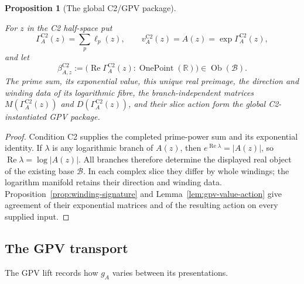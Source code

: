 \documentclass[11pt]{article}
\newcommand{\RR}{\mathbb{R}}
\providecommand{\lean}[1]{}
\providecommand{\uses}[1]{}
\theoremstyle{plain}
\newtheorem{proposition}[theorem]{Proposition}
\theoremstyle{definition}
\theoremstyle{remark}
\begin{document}
\begin{proposition}[The global C2/GPV package]\label{prop:c2-gpv-package}
\lean{ASection.C2GpvPackage.exp_canonicalLift,
ASection.C2GpvPackage.canonicalLift_eq_primePower,
ASection.C2GpvPackage.branch_re_eq,
ASection.C2GpvPackage.branch_winding,
ASection.C2GpvPackage.branch_realPreimage_eq,
ASection.C2GpvPackage.branch_exponentialMatrix_eq,
ASection.C2GpvPackage.branch_diskAction_eq,
ASection.C2GpvPackage.branch_sliceActionHom_eq}
\uses{def:A-section, thm:log-manifold, lem:gpv-value-action}
For $z$ in the C2 half-space put
\[
 \Gamma_A^{\mathrm{C2}}(z)=\sum_p\ell_p(z),\qquad
 v_A^{\mathrm{C2}}(z)=A(z)=\exp\Gamma_A^{\mathrm{C2}}(z),
\]
and let
\[
 \beta^{\mathrm{C2}}_{A,z}:=
 \bigl(\operatorname{Re}\Gamma_A^{\mathrm{C2}}(z):
       \operatorname{OnePoint}(\RR)\bigr)
 \in\operatorname{Ob}(\mathcal B).
                                                        \tag{$\beta$}\label{eq:gpv-base-object}
\]
The prime sum, its exponential value, this unique real preimage, the
direction and winding data of its logarithmic fibre, the branch-independent
matrices $M(\Gamma_A^{\mathrm{C2}}(z))$ and
$D(\Gamma_A^{\mathrm{C2}}(z))$, and their slice action form the global
C2-instantiated GPV package.
\end{proposition}

\begin{proof}
Condition \textup{C2} supplies the completed prime-power sum and its
exponential identity. If $\lambda$ is any logarithmic branch of $A(z)$,
then
$e^{\operatorname{Re}\lambda}=|A(z)|$, so
$\operatorname{Re}\lambda=\log|A(z)|$. All branches therefore determine
the displayed real object of the existing base $\mathcal B$. In each
complex slice they differ by whole windings; the logarithm manifold retains
their direction and winding data. Proposition~\ref{prop:winding-signature}
and Lemma~\ref{lem:gpv-value-action} give agreement of their exponential
matrices and of the resulting action on every supplied input.
\end{proof}

\subsection*{The GPV transport}

The GPV lift records how $g_A$ varies between its presentations.
\end{document}
